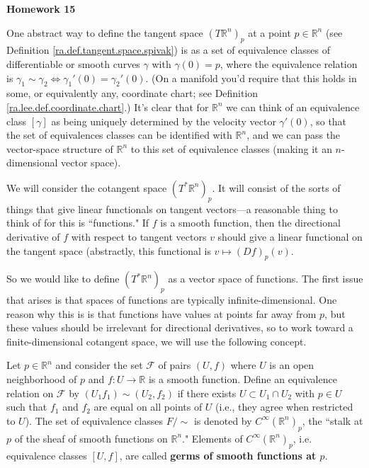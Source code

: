 \textbf{Homework 15}

One abstract way to define the tangent space \((T\mathbb{R}^n)_p\) at a point \(p \in \mathbb{R}^n\) (see Definition \ref{ra.def.tangent.space.spivak}) is as a set of equivalence classes of differentiable or smooth curves \(\gamma\) with \(\gamma(0) = p\), where the equivalence relation is \(\gamma_1 \sim \gamma_2 \iff \gamma_1'(0) = \gamma_2'(0)\). (On a manifold you'd require that this holds in some, or equivalently any, coordinate chart; see Definition \ref{ra.lee.def.coordinate.chart}.) It's clear that for \(\mathbb{R}^n\) we can think of an equivalence class \([\gamma]\) as being uniquely determined by the velocity vector \(\gamma'(0)\), so that the set of equivalences classes can be identified with \(\mathbb{R}^n\), and we can pass the vector-space structure of \(\mathbb{R}^n\) to this set of equivalence classes (making it an \(n\)-dimensional vector space). 

We will consider the cotangent space \((T^* \mathbb{R}^n)_p\). It will consist of the sorts of things that give linear functionals on tangent vectors---a reasonable thing to think of for this is ``functions." If \(f\) is a smooth function, then the directional derivative of \(f\) with respect to tangent vectors \(v\) should give a linear functional on the tangent space (abstractly, this functional is \(v \mapsto (Df)_p(v)\). 

So we would like to define \((T^* \mathbb{R}^n)_p\) as a vector space of functions. The first issue that arises is that spaces of functions are typically infinite-dimensional. One reason why this is is that functions have values at points far away from \(p\), but these values should be irrelevant for directional derivatives, so to work toward a finite-dimensional cotangent space, we will use the following concept.

\begin{definition}

Let \(p \in \mathbb{R}^n\) and consider the set \(\mathcal{F}\) of pairs \((U,f)\) where \(U\) is an open neighborhood of \(p\) and \(f: U \to \mathbb{R}\) is a smooth function. Define an equivalence relation on \(\mathcal{F}\) by \((U_1 f_1) \sim (U_2, f_2) \) if there exists \(U \subset U_1 \cap U_2\) with \(p \in U\) such that \(f_1\) and \(f_2\) are equal on all points of \(U\) (i.e., they agree when restricted to \(U\)). The set of equivalence classes \(F/ \sim\) is denoted by \(C^\infty(\mathbb{R}^n)_p\), the ``stalk at \(p\) of the sheaf of smooth functions on \(\mathbb{R}^n\)." Elements of \(C^\infty(\mathbb{R}^n)_p\), i.e. equivalence classes \([U,f]\), are called \textbf{germs of smooth functions at \(p\)}.

\end{definition}

